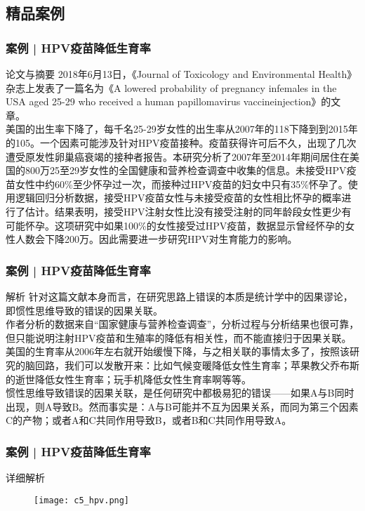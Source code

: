 \subsection{精品案例}
\begin{frame}
  \frametitle{案例 | HPV疫苗降低生育率}
  \begin{block}{论文与摘要}
  2018年6月13日，《Journal of Toxicology and Environmental Health》杂志上发表了一篇名为《A lowered probability of pregnancy infemales in the USA aged 25-29 who received a human papillomavirus vaccineinjection》的文章。\\
  美国的出生率下降了，每千名25-29岁女性的出生率从2007年的118下降到到2015年的105。一个因素可能涉及针对HPV疫苗接种。疫苗获得许可后不久，出现了几次遭受原发性卵巢癌衰竭的接种者报告。本研究分析了2007年至2014年期间居住在美国的800万25至29岁女性的全国健康和营养检查调查中收集的信息。未接受HPV疫苗女性中约60\%至少怀孕过一次，而接种过HPV疫苗的妇女中只有35\%怀孕了。使用逻辑回归分析数据，接受HPV疫苗女性与未接受疫苗的女性相比怀孕的概率进行了估计。结果表明，接受HPV注射女性比没有接受注射的同年龄段女性更少有可能怀孕。这项研究中如果100\%的女性接受过HPV疫苗，数据显示曾经怀孕的女性人数会下降200万。因此需要进一步研究HPV对生育能力的影响。
  \end{block}
\end{frame}

\begin{frame}
  \frametitle{案例 | HPV疫苗降低生育率}
  \begin{block}{解析}
    针对这篇文献本身而言，在研究思路上错误的本质是统计学中的\alert{因果谬论}，即惯性思维导致的错误的因果关联。\\
\vspace{0.5em}
作者分析的数据来自“国家健康与营养检查调查”，分析过程与分析结果也很可靠，但只能说明注射HPV疫苗和生殖率的降低有相关性，而不能直接归于因果关联。美国的生育率从2006年左右就开始缓慢下降，与之相关联的事情太多了，按照该研究的脑回路，我们可以发散开来：比如气候变暖降低女性生育率；苹果教父乔布斯的逝世降低女性生育率；玩手机降低女性生育率啊等等。\\
\vspace{0.5em}
\alert{惯性思维导致错误的因果关联}，是任何研究中都极易犯的错误——如果A与B同时出现，则A导致B。然而事实是：A与B可能并不互为因果关系，而同为第三个因素C的产物；或者A和C共同作用导致B，或者B和C共同作用导致A。
  \end{block}
\end{frame}

\begin{frame}
  \frametitle{案例 | HPV疫苗降低生育率}
  \begin{block}{详细解析}
    \begin{figure}
      \centering
      \texttt{[image: c5\_hpv.png]}
    \end{figure}
  \end{block}
\end{frame}

